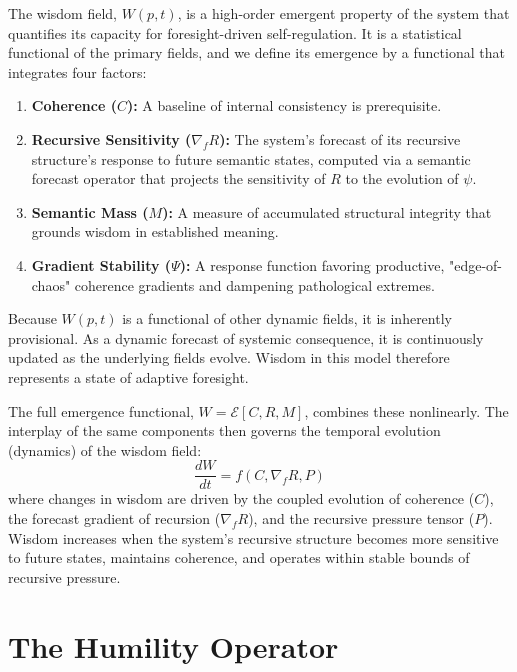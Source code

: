 The wisdom field, \(W(p, t)\), is a high-order emergent property of the system that quantifies its capacity for foresight-driven self-regulation. It is a statistical functional of the primary fields, and we define its emergence by a functional that integrates four factors:
\begin{enumerate}
    \item \textbf{Coherence (\(C\)):} A baseline of internal consistency is prerequisite.
    \item \textbf{Recursive Sensitivity (\(\nabla_f R\)):} The system's forecast of its recursive structure's response to future semantic states, computed via a semantic forecast operator that projects the sensitivity of \(R\) to the evolution of \(\psi\).
    \item \textbf{Semantic Mass (\(M\)):} A measure of accumulated structural integrity that grounds wisdom in established meaning.
    \item \textbf{Gradient Stability (\(\Psi\)):} A response function favoring productive, "edge-of-chaos" coherence gradients and dampening pathological extremes.
\end{enumerate}
Because \(W(p,t)\) is a functional of other dynamic fields, it is inherently provisional. As a dynamic forecast of systemic consequence, it is continuously updated as the underlying fields evolve. Wisdom in this model therefore represents a state of adaptive foresight.

The full emergence functional, \(W = \mathcal{E}[C, R, M]\), combines these nonlinearly. The interplay of the same components then governs the temporal evolution (dynamics) of the wisdom field:
\begin{equation}
\frac{dW}{dt} = f(C, \nabla_f R, P)
\end{equation}
where changes in wisdom are driven by the coupled evolution of coherence (\(C\)), the forecast gradient of recursion (\(\nabla_f R\)), and the recursive pressure tensor (\(P\)). Wisdom increases when the system's recursive structure becomes more sensitive to future states, maintains coherence, and operates within stable bounds of recursive pressure.


\section{The Humility Operator}
\label{sec:the_humility_operator}

